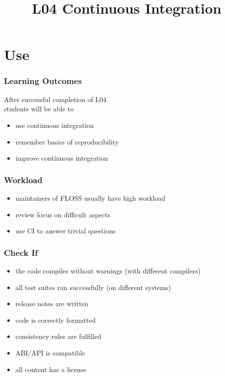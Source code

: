 

\title{L04 Continuous Integration}



\section{Use}

\begin{frame}
	\frametitle{Learning Outcomes}
	After successful completion of L04 \\
	students will be able to

	\begin{itemize}
	\item use continuous integration
	\item remember basics of reproducibility
	\item improve continuous integration
	\end{itemize}
\end{frame}

\begin{frame}
	\frametitle{Workload}

	\begin{itemize}[<+-| alert@+>]
	\item maintainers of FLOSS usually have high workload
	\item review focus on difficult aspects
	\item use CI to answer trivial questions
	\end{itemize}
\end{frame}

\begin{frame}
	\frametitle{Check If}

	\begin{itemize}[<+-| alert@+>]
	\item the code compiles without warnings (with different compilers)
	\item all test suites run successfully (on different systems)
	\item release notes are written
	\item code is correctly formatted
	\item consistency rules are fulfilled
	\item ABI/API is compatible
	\item all content has a license
	\end{itemize}
\end{frame}

